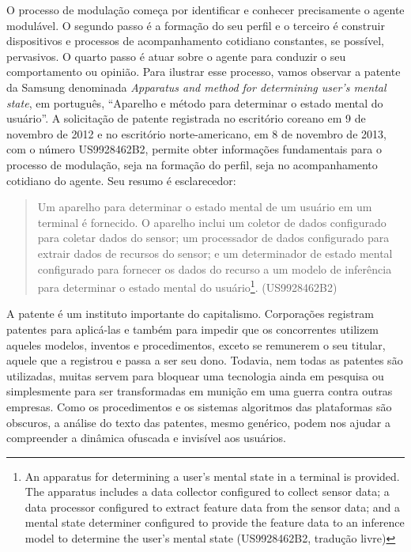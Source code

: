 O processo de modulação começa por identificar e conhecer precisamente o
agente modulável. O segundo passo é a formação do seu perfil e o
terceiro é construir dispositivos e processos de acompanhamento
cotidiano constantes, se possível, pervasivos. O quarto passo é atuar
sobre o agente para conduzir o seu comportamento ou opinião. Para
ilustrar esse processo, vamos observar a patente da Samsung denominada
\emph{Apparatus and method for determining user's mental state}, em
português, ``Aparelho e método para determinar o estado mental do
usuário''. A solicitação de patente registrada no escritório coreano em
9 de novembro de 2012 e no escritório norte-americano, em 8 de novembro
de 2013, com o número US9928462B2, permite obter informações
fundamentais para o processo de modulação, seja na formação do perfil,
seja no acompanhamento cotidiano do agente. Seu resumo é esclarecedor:

\begin{quote}
Um aparelho para determinar o estado mental de um usuário em um terminal
é fornecido. O aparelho inclui um coletor de dados configurado para
coletar dados do sensor; um processador de dados configurado para
extrair dados de recursos do sensor; e um determinador de estado mental
configurado para fornecer os dados do recurso a um modelo de inferência
para determinar o estado mental do usuário\footnote{An apparatus for
  determining a user's mental state in a terminal is provided. The
  apparatus includes a data collector configured to collect sensor data;
  a data processor configured to extract feature data from the sensor
  data; and a mental state determiner configured to provide the feature
  data to an inference model to determine the user's mental state
  (US9928462B2, tradução livre)}. (US9928462B2)
\end{quote}

A patente é um instituto importante do capitalismo. Corporações
registram patentes para aplicá-las e também para impedir que os
concorrentes utilizem aqueles modelos, inventos e procedimentos, exceto
se remunerem o seu titular, aquele que a registrou e passa a ser seu
dono. Todavia, nem todas as patentes são utilizadas, muitas servem para
bloquear uma tecnologia ainda em pesquisa ou simplesmente para ser
transformadas em munição em uma guerra contra outras empresas. Como os
procedimentos e os sistemas algoritmos das plataformas são obscuros, a
análise do texto das patentes, mesmo genérico, podem nos ajudar a
compreender a dinâmica ofuscada e invisível aos usuários.

